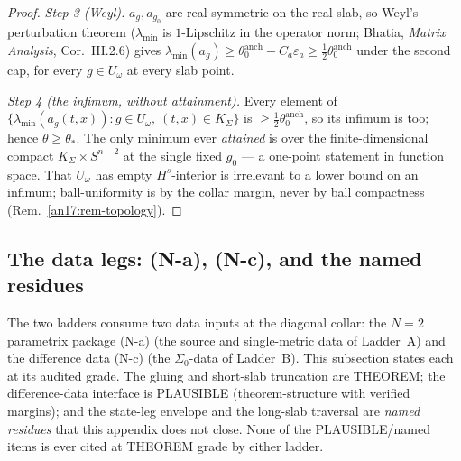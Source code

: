 \begin{proof}
\emph{Step 3 (Weyl).} $a_g,a_{g_0}$ are real symmetric on the real slab,
so Weyl's perturbation theorem ($\lambda_{\min}$ is $1$-Lipschitz in the
operator norm; Bhatia, \emph{Matrix Analysis}, Cor.~III.2.6) gives
$\lambda_{\min}(a_g)\ge\theta_0^{\mathrm{anch}}-C_a\varepsilon_a\ge
\tfrac12\theta_0^{\mathrm{anch}}$ under the second cap, for every $g\in
U_\omega$ at every slab point.

\emph{Step 4 (the infimum, without attainment).} Every element of
$\{\lambda_{\min}(a_g(t,x)):g\in U_\omega,\ (t,x)\in K_\Sigma\}$ is
$\ge\tfrac12\theta_0^{\mathrm{anch}}$, so its infimum is too; hence
$\theta\ge\theta_*$. The only minimum ever \emph{attained} is over the
finite-dimensional compact $K_\Sigma\times S^{n-2}$ at the single fixed
$g_0$ --- a one-point statement in function space. That $U_\omega$ has
empty $H^s$-interior is irrelevant to a lower bound on an infimum;
ball-uniformity is by the collar margin, never by ball compactness
(Rem.~\ref{an17:rem-topology}).
\end{proof}

\subsection{The data legs: \textup{(N-a)}, \textup{(N-c)}, and the named
residues}\label{an17:sec-data}

The two ladders consume two data inputs at the diagonal collar: the $N{=}2$
parametrix package \textup{(N-a)} (the source and single-metric data of Ladder~A)
and the difference data \textup{(N-c)} (the $\Sigma_0$-data of Ladder~B). This
subsection states each at its audited grade. The gluing and short-slab
truncation are THEOREM; the difference-data interface is PLAUSIBLE
(theorem-structure with verified margins); and the state-leg envelope and the
long-slab traversal are \emph{named residues} that this appendix does not close.
None of the PLAUSIBLE/named items is ever cited at THEOREM grade by either
ladder.

